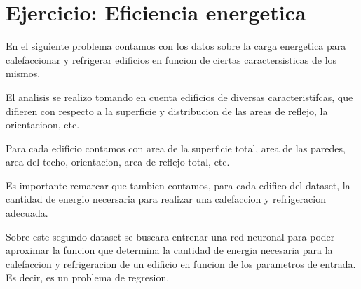 \section{Ejercicio: Eficiencia energetica}

En el siguiente problema contamos con los datos sobre la carga energetica para calefaccionar y refrigerar edificios en funcion de ciertas caractersisticas de los mismos.

El analisis se realizo tomando en cuenta edificios de diversas caracteristifcas, que difieren con respecto a la superficie y distribucion de las areas de reflejo, la orientacioon, etc.

Para cada edificio contamos con area de la superficie total, area de las paredes, area del techo, orientacion, area de reflejo total, etc.

Es importante remarcar que tambien contamos, para cada edifico del dataset, la cantidad de energio necersaria para realizar una calefaccion y refrigeracion adecuada.

Sobre este segundo dataset se buscara entrenar una red neuronal para poder aproximar la funcion que determina la cantidad de energia necesaria para
la calefaccion y refrigeracion de un edificio en funcion de los parametros de entrada. Es decir, es un problema de regresion.

